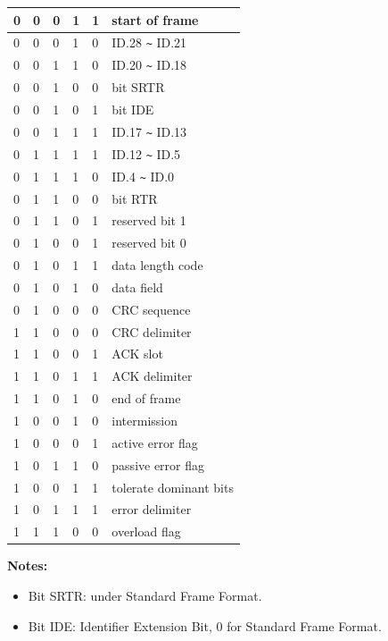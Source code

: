 \begin{longtable}[c]{|p{2cm}<{\centering}|p{2cm}<{\centering}|p{2cm}<{\centering}|p{2cm}<{\centering}|p{2cm}<{\centering}|p{4cm}|}
    0 & 0 & 0 & 1 & 1 & start of frame
    \\\hline
    0 & 0 & 0 & 1 & 0 & ID.28 \verb+~+ ID.21
    \\\hline
    0 & 0 & 1 & 1 & 0 & ID.20 \verb+~+ ID.18
    \\\hline
    0 & 0 & 1 & 0 & 0 & bit SRTR
    \\\hline
    0 & 0 & 1 & 0 & 1 & bit IDE
    \\\hline
    0 & 0 & 1 & 1 & 1 & ID.17 \verb+~+ ID.13
    \\\hline
    0 & 1 & 1 & 1 & 1 & ID.12 \verb+~+ ID.5
    \\\hline
    0 & 1 & 1 & 1 & 0 & ID.4 \verb+~+ ID.0
    \\\hline
    0 & 1 & 1 & 0 & 0 & bit RTR
    \\\hline
    0 & 1 & 1 & 0 & 1 & reserved bit 1
    \\\hline
    0 & 1 & 0 & 0 & 1 & reserved bit 0
    \\\hline
    0 & 1 & 0 & 1 & 1 & data length code
    \\\hline
    0 & 1 & 0 & 1 & 0 & data field
    \\\hline
    0 & 1 & 0 & 0 & 0 & CRC sequence
    \\\hline
    1 & 1 & 0 & 0 & 0 & CRC delimiter
    \\\hline
    1 & 1 & 0 & 0 & 1 & ACK slot
    \\\hline
    1 & 1 & 0 & 1 & 1 & ACK delimiter
    \\\hline
    1 & 1 & 0 & 1 & 0 & end of frame
    \\\hline
    1 & 0 & 0 & 1 & 0 & intermission
    \\\hline
    1 & 0 & 0 & 0 & 1 & active error flag
    \\\hline
    1 & 0 & 1 & 1 & 0 & passive error flag
    \\\hline
    1 & 0 & 0 & 1 & 1 & tolerate dominant bits
    \\\hline
    1 & 0 & 1 & 1 & 1 & error delimiter
    \\\hline
    1 & 1 & 1 & 0 & 0 & overload flag
    \\\hline
\end{longtable}
\vspace{-1.5em}
{\bfseries Notes:}\\
\begin{itemize}
    \item Bit SRTR: under Standard Frame Format.
    \item Bit IDE: Identifier Extension Bit, 0 for Standard Frame Format.

\end{itemize}
